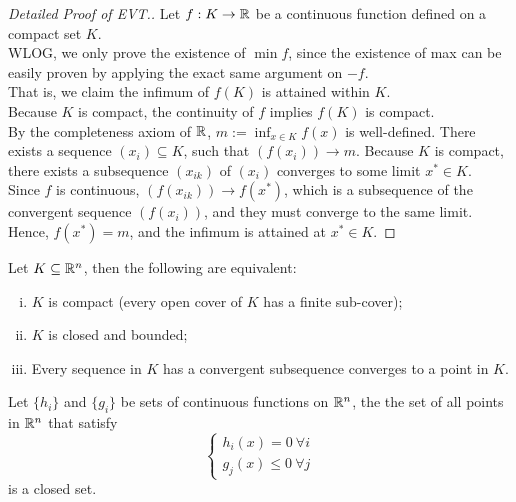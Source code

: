 \documentclass{article}
\begin{document}
    \begin{proof}[Detailed Proof of EVT.]
    	Let $f: K \to \mathbb{R}$ be a continuous function defined on a compact set $K$.\\
    	WLOG, we only prove the existence of $\min f$, since the existence of max can be easily proven by applying the exact same argument on $-f$. \\
    	That is, we claim the infimum of $f(K)$ is attained within $K$. \\
    	Because $K$ is compact, the continuity of $f$ implies $f(K)$ is compact. \\
    	By the completeness axiom of $\mathbb{R}$, $m := \inf_{x \in K} f(x)$ is well-defined. There exists a sequence $(x_i) \subseteq K$, such that $(f(x_i)) \to m$. Because $K$ is compact, there exists a subsequence $(x_{ik})$ of $(x_i)$ converges to some limit $x^* \in K$. \\
    	Since $f$ is continuous, $(f(x_{ik})) \to f(x^*)$, which is a subsequence of the convergent sequence $(f(x_i))$, and they must converge to the same limit. Hence, $f(x^*) = m$, and the infimum is attained at $x^* \in K$.
    \end{proof}
    
    \begin{theorem}
    	Let $K \subseteq \mathbb{R}^n$, then the following are equivalent:
    	\begin{enumerate}[(i)]
    		\item $K$ is compact (every open cover of $K$ has a finite sub-cover);
    		\item $K$ is closed and bounded;
    		\item Every sequence in $K$ has a convergent subsequence converges to a point in $K$.
    	\end{enumerate}
    \end{theorem}
    
	\begin{proposition}
		Let $\{h_i\}$ and $\{g_i\}$ be sets of continuous functions on $\mathbb{R}^n$, the the set of all points in $\mathbb{R}^n$ that satisfy
		\begin{equation}
			\begin{cases}
				h_i(x) = 0\ \forall i\\
				g_j(x) \leq 0\ \forall j
			\end{cases}
		\end{equation}
		is a closed set.
	\end{proposition}
	
\end{document}
